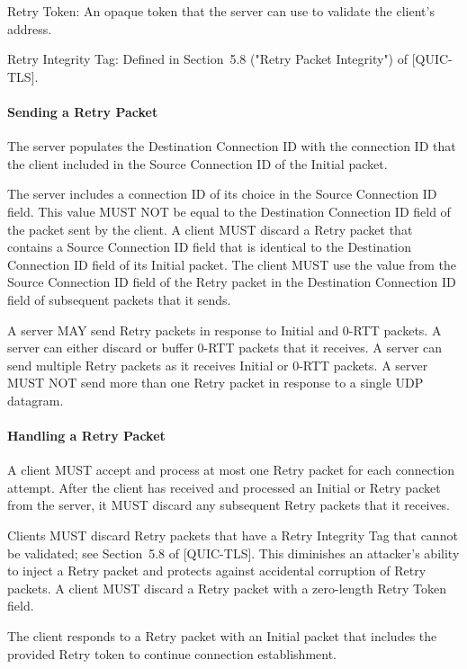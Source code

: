 \documentclass{article}
\begin{document}
Retry Token:  An opaque token that the server can use to validate the client's address.

Retry Integrity Tag:  Defined in Section~5.8 ("Retry Packet Integrity") of [QUIC-TLS].

\paragraph{Sending a Retry Packet}

The server populates the Destination Connection ID with the connection ID that the client included in the Source Connection ID of the Initial packet.

The server includes a connection ID of its choice in the Source Connection ID field.  This value MUST NOT be equal to the Destination Connection ID field of the packet sent by the client.  A client MUST discard a Retry packet that contains a Source Connection ID field that is identical to the Destination Connection ID field of its Initial packet.  The client MUST use the value from the Source Connection ID field of the Retry packet in the Destination Connection ID field of subsequent packets that it sends.

A server MAY send Retry packets in response to Initial and 0-RTT packets.  A server can either discard or buffer 0-RTT packets that it receives.  A server can send multiple Retry packets as it receives Initial or 0-RTT packets.  A server MUST NOT send more than one Retry packet in response to a single UDP datagram.

\paragraph{Handling a Retry Packet}

A client MUST accept and process at most one Retry packet for each connection attempt.  After the client has received and processed an Initial or Retry packet from the server, it MUST discard any subsequent Retry packets that it receives.

Clients MUST discard Retry packets that have a Retry Integrity Tag that cannot be validated; see Section~5.8 of [QUIC-TLS].  This diminishes an attacker's ability to inject a Retry packet and protects against accidental corruption of Retry packets.  A client MUST discard a Retry packet with a zero-length Retry Token field.

The client responds to a Retry packet with an Initial packet that includes the provided Retry token to continue connection establishment.
\end{document}
